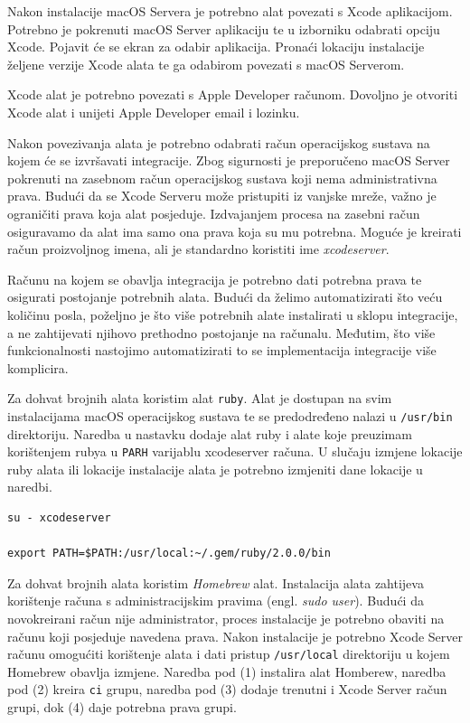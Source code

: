 \documentclass[times, utf8, diplomski, numeric]{fer}
\newcommand{\eng}[1]{(engl. \textit{#1})}
\begin{document}
\begin{appendices}
Nakon instalacije macOS Servera je potrebno alat povezati s Xcode aplikacijom. Potrebno je pokrenuti macOS Server aplikaciju te u izborniku odabrati opciju Xcode. Pojavit će se ekran za odabir aplikacija. Pronaći lokaciju instalacije željene verzije Xcode alata te ga odabirom povezati s macOS Serverom.

Xcode alat je potrebno povezati s Apple Developer računom. Dovoljno je otvoriti Xcode alat i unijeti Apple Developer email i lozinku.

Nakon povezivanja alata je potrebno odabrati račun operacijskog sustava na kojem će se izvršavati integracije. Zbog sigurnosti je preporučeno macOS Server pokrenuti na zasebnom račun operacijskog sustava koji nema administrativna prava. Budući da se Xcode Serveru može pristupiti iz vanjske mreže, važno je ograničiti prava koja alat posjeduje. Izdvajanjem procesa na zasebni račun osiguravamo da alat ima samo ona prava koja su mu potrebna. Moguće je kreirati račun proizvoljnog imena, ali je standardno koristiti ime \textit{xcodeserver}.

Računu na kojem se obavlja integracija je potrebno dati potrebna prava te osigurati postojanje potrebnih alata. Budući da želimo automatizirati što veću količinu posla, poželjno je što više potrebnih alate instalirati u sklopu integracije, a ne zahtijevati njihovo prethodno postojanje na računalu. Međutim, što više funkcionalnosti nastojimo automatizirati to se implementacija integracije više komplicira.

Za dohvat brojnih alata koristim alat \verb|ruby|. Alat je dostupan na svim instalacijama macOS operacijskog sustava te se predodređeno nalazi u \verb|/usr/bin| direktoriju. Naredba u nastavku dodaje alat ruby i alate koje preuzimam korištenjem rubya u \verb|PARH| varijablu xcodeserver računa. U slučaju izmjene lokacije ruby alata ili lokacije instalacije alata je potrebno izmjeniti dane lokacije u naredbi.

\begin{verbatim}
su - xcodeserver

export PATH=$PATH:/usr/local:~/.gem/ruby/2.0.0/bin
\end{verbatim}

Za dohvat brojnih alata koristim \textit{Homebrew} alat. Instalacija alata zahtijeva korištenje računa s administracijskim pravima \eng{sudo user}. Budući da novokreirani račun nije administrator, proces instalacije je potrebno obaviti na računu koji posjeduje navedena prava. Nakon instalacije je potrebno Xcode Server računu omogućiti korištenje alata i dati pristup \verb|/usr/local| direktoriju u kojem Homebrew obavlja izmjene. Naredba pod (1) instalira alat Homberew, naredba pod (2) kreira \verb|ci| grupu, naredba pod (3) dodaje trenutni i Xcode Server račun grupi, dok (4) daje potrebna prava grupi.


\end{appendices}
\end{document}
